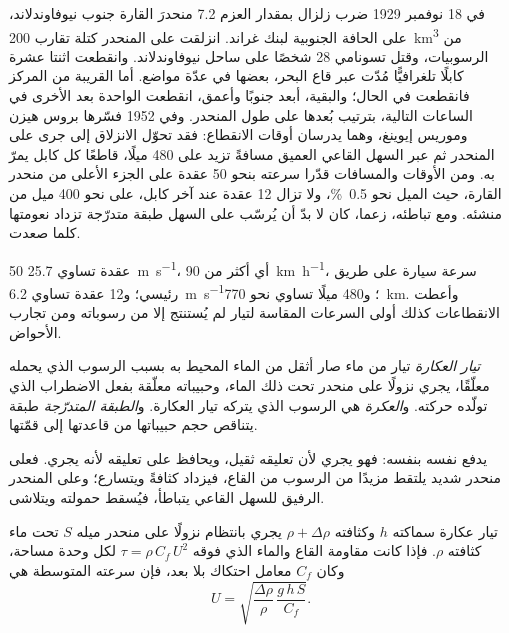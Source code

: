 \begin{history}
في 18 نوفمبر 1929 ضرب زلزال بمقدار العزم 7.2 منحدرَ القارة جنوب نيوفاوندلاند، على الحافة الجنوبية لبنك غراند. انزلقت على المنحدر كتلة تقارب \qty{200}{km^3} من الرسوبيات، وقتل تسونامي 28 شخصًا على ساحل نيوفاوندلاند. وانقطعت اثنتا عشرة كابلًا تلغرافيًّا مُدّت عبر قاع البحر، بعضها في عدّة مواضع. أما القريبة من المركز فانقطعت في الحال؛ والبقية، أبعد جنوبًا وأعمق، انقطعت الواحدة بعد الأخرى في الساعات التالية، بترتيب بُعدها على طول المنحدر. وفي 1952 فسّرها بروس هيزن وموريس إيوينغ، وهما يدرسان أوقات الانقطاع: فقد تحوّل الانزلاق إلى  جرى على المنحدر ثم عبر السهل القاعي العميق مسافةً تزيد على 480 ميلًا، قاطعًا كل كابل يمرّ به. ومن الأوقات والمسافات قدّرا سرعته بنحو 50 عقدة على الجزء الأعلى من منحدر القارة، حيث الميل نحو \qty{0.5}{\percent}، ولا تزال 12 عقدة عند آخر كابل، على نحو 400 ميل من منشئه. ومع تباطئه، زعما، كان لا بدّ أن يُرسّب على السهل طبقة متدرّجة تزداد نعومتها كلما صعدت.
\end{history}

50 عقدة تساوي \qty{25.7}{m.s^{-1}}، أي أكثر من \qty{90}{km.h^{-1}}، سرعة سيارة على طريق رئيسي؛ و\num{12} عقدة تساوي \qty{6.2}{m.s^{-1}}؛ و\num{480} ميلًا تساوي نحو \qty{770}{km}. وأعطت الانقطاعات كذلك أولى السرعات المقاسة لتيار لم يُستنتج إلا من رسوباته ومن تجارب الأحواض.

\begin{definition}\label{def:b1:clastic-sediments:turbidite}
\emph{تيار العكارة} تيار من ماء صار أثقل من الماء المحيط به بسبب الرسوب الذي يحمله معلّقًا، يجري نزولًا على منحدر تحت ذلك الماء، وحبيباته معلّقة بفعل الاضطراب الذي تولّده حركته. و\emph{العكرة} هي الرسوب الذي يتركه تيار العكارة. و\emph{الطبقة المتدرّجة} طبقة يتناقص حجم حبيباتها من قاعدتها إلى قمّتها.
\end{definition}

يدفع  نفسه بنفسه: فهو يجري لأن تعليقه ثقيل، ويحافظ على تعليقه لأنه يجري. فعلى منحدر شديد يلتقط مزيدًا من الرسوب من القاع، فيزداد كثافةً ويتسارع؛ وعلى المنحدر الرفيق للسهل القاعي يتباطأ، فيُسقط حمولته ويتلاشى.

\begin{proposition}\label{prop:b1:clastic-sediments:turbidity}
تيار عكارة سماكته $h$ وكثافته $\rho + \Delta\rho$ يجري بانتظام نزولًا على منحدر ميله $S$ تحت ماء كثافته $\rho$. فإذا كانت مقاومة القاع والماء الذي فوقه $\tau = \rho\,C_f\,U^2$ لكل وحدة مساحة، وكان $C_f$ معامل احتكاك بلا بعد، فإن سرعته المتوسطة هي
\[
  U = \sqrt{\frac{\Delta\rho}{\rho}\,\frac{g\,h\,S}{C_f}} .
\]
\end{proposition}

